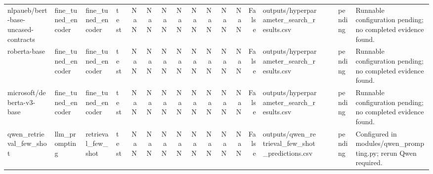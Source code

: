 \begin{tabular}{llllrrrrrrrrrlllll}
nlpaueb/bert-base-uncased-contracts & fine\_tuned\_encoder & fine\_tuned\_encoder & test & NaN & NaN & NaN & NaN & NaN & NaN & NaN & NaN & False & outputs/hyperparameter\_search\_results.csv &  &  & pending & Runnable configuration pending; no completed evidence found. \\
roberta-base & fine\_tuned\_encoder & fine\_tuned\_encoder & test & NaN & NaN & NaN & NaN & NaN & NaN & NaN & NaN & False & outputs/hyperparameter\_search\_results.csv &  &  & pending & Runnable configuration pending; no completed evidence found. \\
microsoft/deberta-v3-base & fine\_tuned\_encoder & fine\_tuned\_encoder & test & NaN & NaN & NaN & NaN & NaN & NaN & NaN & NaN & False & outputs/hyperparameter\_search\_results.csv &  &  & pending & Runnable configuration pending; no completed evidence found. \\
qwen\_retrieval\_few\_shot & llm\_prompting & retrieval\_few\_shot & test & NaN & NaN & NaN & NaN & NaN & NaN & NaN & NaN & False & outputs/qwen\_retrieval\_few\_shot\_predictions.csv &  &  & pending & Configured in modules/qwen\_prompting.py; rerun Qwen required. \\
\bottomrule
\end{tabular}
